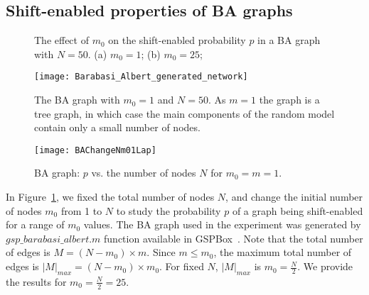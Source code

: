 \documentclass[journal]{IEEEtran}
\begin{document}
\subsection{Shift-enabled properties of BA graphs}
\begin{figure}[htb]
	\centering
	\quad

	\centering

	\caption{The effect of $m_0$ on the shift-enabled probability $p$ in a BA graph with $N=50$.
		(a) $m_0=1$; 
		(b) $m_0=25$;
	}
	\label{fig：BA_fix_change_m0}
\end{figure}
	\begin{figure}[htb]
	    \centering
	    \texttt{[image: Barabasi\_Albert\_generated\_network]}
	    \caption{The BA graph with $m_0=1$ and $N=50$. As $m=1$ the graph is a tree graph, in which case the  main components of the random model contain only a small number of nodes.} %
	    \label{fig:BA graph with m0_1}
	\end{figure}
\begin{figure}[htb]
    \centering
    \texttt{[image: BAChangeNm01Lap]}
    \caption{BA graph: $p$ vs. the number of nodes $N$ for $m_0=m=1$.}
    \label{fig:BAChangeN_m0_1}
\end{figure}
In Figure~\ref{fig：BA_fix_change_m0}, we fixed the total number of nodes $N$, and change the initial number of nodes $m_0$ from 1 to $N$ to study the probability $p$ of a graph being shift-enabled for a range of $m_0$ values.
 The BA graph used in the experiment was generated by $gsp\_barabasi\_albert.m$ function available in GSPBox~\cite{perraudin2014gspbox}. 
 Note that the total number of edges is $M=(N-m_0)\times m$.  Since $m\leq m_0$, the maximum total number of edges is $|M|_{max}=(N-m_0)\times m_0$. For fixed $N$, $|M|_{max}$ is $m_0=\frac{N}{2}$. We provide the results for $m_0=\frac{N}{2}=25$.
 
\end{document}
